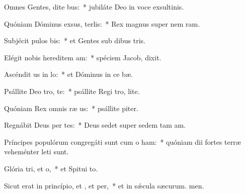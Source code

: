 \item Omnes Gentes, dite bus:~* jubiláte Deo in voce exsultinis.
\item Quóniam Dóminus exsus, terlis:~* Rex magnus super nem ram.
\item Subjécit pulos bis:~* et Gentes sub dibus tris.
\item Elégit nobis hereditem am:~* spéciem Jacob,  dixit.
\item Ascéndit us in lo:~* et Dóminus in ce bæ.
\item Psállite Deo tro, te:~* psállite Regi tro, lite.
\item Quóniam Rex omnis ræ us:~* psállite piter.
\item Regnábit Deus per tes:~* Deus sedet super sedem tam am.
\item Príncipes populórum congregáti sunt cum o ham:~* quóniam dii fortes terræ veheménter leti sunt.
\item Glória tri, et o,~* et Spitui to.
\item Sicut erat in princípio, et , et per,~* et in sǽcula sæcurum. men.
